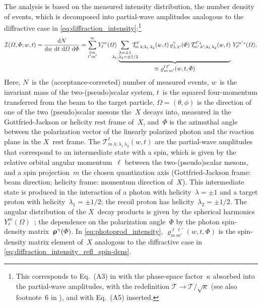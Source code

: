 The analysis is based on the measured intensity distribution, \ie the
number density of events, which is decomposed into partial-wave
amplitudes analogous to the diffractive case in
\cref{eq:diffraction_intensity}:\footnote{\label{fn:photoprod_ampl_redef}This
corresponds to Eq.~(A3) in  with the
phase-space factor~$\kappa$ absorbed into the partial-wave amplitudes,
\ie with the redefinition $\mathcal{T} \to \mathcal{T} /
\sqrt{\kappa}$ (see also footnote~6 in ), and
with Eq.~(A5) inserted.}
\begin{equation}
  \label{eq:photoprod_intensity}
  \mathcal{I}(\Omega, \Phi; w, t)
  = \frac{\dif{N}}{\dif{w}\, \dif{t}\, \dif{\Omega}\, \dif{\Phi}}
  = \sum_{\substack{\ell m \\ \ell' m'}}^\infty
  Y_\ell^m(\Omega)~
  \dUnderbrace{\sum_{\substack{\lambda = \pm 1 \\ \mathclap{\lambda_1, \lambda_2 = \pm 1/2}}}
  \mathcal{T}^\ell_{\!m\, \lambda; \lambda_1\, \lambda_2}(w, t)\,
  \varrho^\gamma_{\lambda\, \lambda'}(\Phi)\,
  \mathcal{T}^{\ell' *}_{\!m'\, \lambda'; \lambda_1\, \lambda_2}(w, t)}{\equiv \varrho^{\ell\, \ell'}_{m\, m'}(w, t, \Phi)}~
  Y_{\ell'}^{m' *}(\Omega).
\end{equation}
Here, $N$~is the (acceptance-corrected) number of measured events,
$w$~is the invariant mass of the two-(pseudo)scalar system, $t$~is the
squared four-momentum transferred from the beam to the target
particle, $\Omega = (\theta, \phi)$ is the direction of one of the two
(pseudo)scalar mesons the~$X$ decays into, measured in the
Gottfried-Jackson or helicity rest frame of~$X$, and~$\Phi$ is the
azimuthal angle between the polarization vector of the
linearly polarized photon and the reaction plane in the $X$~rest
frame.  The $\mathcal{T}^\ell_{\!m\, \lambda; \lambda_1\,
\lambda_2}(w, t)$ are the partial-wave amplitudes that correspond to
an intermediate state with a spin, which is given by the relative
orbital angular momentum~$\ell$ between the two-(pseudo)scalar mesons,
and a spin projection~$m$ \wrt the chosen quantization axis
(Gottfried-Jackson frame: beam direction; helicity frame: momentum
direction of~$X$).  This intermediate state is produced in the
interaction of a photon with helicity~$\lambda = \pm 1$ and a target
proton with helicity~$\lambda_1 = \pm 1/2$; the recoil proton has
helicity~$\lambda_2 = \pm 1/2$.  The angular distribution of the
$X$~decay products is given by the spherical harmonics
$Y_\ell^m(\Omega)$~\cite{wikipedia:sphericalHarm}; the dependence on
the polarization angle~$\Phi$ by the photon spin-density
matrix~$\bm{\mathrm{\upvarrho}}^\gamma(\Phi)$.  In
\cref{eq:photoprod_intensity}, $\varrho^{\ell\, \ell'}_{m\, m'}(w, t,
\Phi)$ is the spin-density matrix element of~$X$ analogous to the
diffractive case in \cref{eq:diffraction_intensity_refl_spin-dens}.

